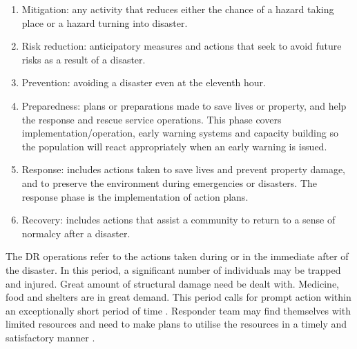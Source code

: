 \begin{enumerate}
\item Mitigation: any activity that reduces either the chance of a hazard taking place or a hazard turning into disaster.
\item Risk reduction: anticipatory measures and actions that seek to avoid future risks as a result of a disaster.
\item Prevention: avoiding a disaster even at the eleventh hour. 
\item Preparedness: plans or preparations made to save lives or property, and help the response and rescue service operations. This phase covers implementation/operation, early warning systems and capacity building so the population will react appropriately when an early warning is issued.
\item Response: includes actions taken to save lives and prevent property damage, and to preserve the environment during emergencies or disasters. The response phase is the implementation of action plans.
\item Recovery: includes actions that assist a community to return to a sense of normalcy after a disaster.
\end{enumerate}

The \ac{DR} operations refer to the actions taken during or in the immediate after of the disaster. In this period, a significant number of individuals may be trapped and injured. Great amount of structural damage need be dealt with. Medicine, food and shelters are in great demand. This period calls for prompt action within an exceptionally short period of time \citep{Wattegama2012}. Responder team may find themselves with limited resources and need to make plans to utilise the resources in a timely and satisfactory manner \citep{Chen2005,Chen2008}. \\



